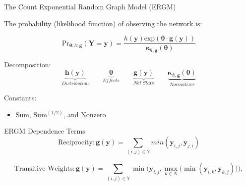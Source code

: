 \documentclass{beamer}
\newcommand{\bt}{\pmb{\theta}}
\begin{document}
\begin{frame}{The Count Exponential Random Graph Model (ERGM)}

The probability (likelihood function) of observing the network is:

$$ \text{Pr}_{\bm{\theta};h;\bm{g}}( \bm{Y}=\bm{y} )=\frac{ h(\bm{y})\text{exp}( \bm{\theta} \cdot \bm{g} (\bm{y}) )}{\bm{\kappa}_{h,\bm{g}}(\bm{\theta})} $$


Decomposition:
$$
\underbrace{\bm{h(y)}}_{Distribution} \qquad \underbrace{\bt}_{Effects} \qquad \underbrace{\bm{g(y)}}_{Net\hspace{3pt} Stats} \qquad \underbrace{\bm{\kappa}_{h,\bm{g}}(\bm{\theta})} _{Normalizer}
$$

Constants:
\begin{itemize}
\item{Sum, Sum$^{(1/2)}$, and Nonzero}
\end{itemize}


\end{frame}

\begin{frame}{ERGM Dependence Terms}
$$ \text{Reciprocity}: \bm{g(y)} = \sum_{(i,j) {\in} \mathbb{Y}}min(\bm{y}_{i,j},\bm{y}_{j,i})$$

$$\text{Transitive Weights}: \bm{g(y)} =  \sum_{(i,j) {\in} \mathbb{Y}}\min\bigg( \bm{y}_{i,j}, \max\limits_{k{\in}N}\Big(\min(\bm{y}_{i,k},\bm{y}_{k,j})\Big) \bigg),$$ 


\end{frame}
\end{document}
